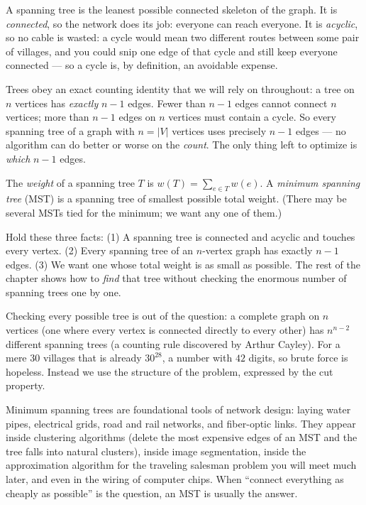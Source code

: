 \begin{intuitionbox}
A spanning tree is the leanest possible connected skeleton of the graph. It is
\emph{connected}, so the network does its job: everyone can reach everyone.
It is \emph{acyclic}, so no cable is wasted: a cycle would
mean two different routes between some pair of villages, and you could snip one
edge of that cycle and still keep everyone connected --- so a cycle is, by
definition, an avoidable expense.
\end{intuitionbox}

Trees obey an exact counting identity that we will rely on throughout: a tree on
$n$ vertices has \emph{exactly} $n-1$ edges. Fewer than $n-1$ edges cannot
connect $n$ vertices; more than $n-1$ edges on $n$ vertices must contain a cycle.
So every spanning tree of a graph with $n=|V|$ vertices uses precisely $n-1$
edges --- no algorithm can do better or worse on the \emph{count}. The only thing
left to optimize is \emph{which} $n-1$ edges.

\begin{definition}\label{ch23:def-mst}
The \emph{weight} of a spanning tree $T$ is $w(T) = \sum_{e \in T} w(e)$. A
\emph{minimum spanning tree} (MST) is a spanning tree of smallest possible total
weight. (There may be several MSTs tied for the minimum; we want any one of
them.)
\end{definition}

\begin{focusbox}
Hold these three facts:
(1) A spanning tree is connected and acyclic and touches every vertex.
(2) Every spanning tree of an $n$-vertex graph has exactly $n-1$ edges.
(3) We want one whose total weight is as small as possible.
The rest of the chapter shows how to \emph{find} that tree without checking the
enormous number of spanning trees one by one.
\end{focusbox}

Checking every possible tree is out of the question:
a complete graph on $n$ vertices (one where every vertex is connected directly to every other) has $n^{n-2}$ different spanning trees (a counting rule discovered by Arthur Cayley). For a mere $30$ villages that is already $30^{28}$, a number with $42$
digits, so brute force is hopeless. Instead we use the structure of the problem,
expressed by the cut property.

\begin{aestheticbox}
Minimum spanning trees are foundational tools of network design: laying water
pipes, electrical grids, road and rail networks, and fiber-optic links. They
appear inside clustering algorithms (delete the most expensive edges of an MST
and the tree falls into natural clusters), inside image segmentation, inside the
approximation algorithm for the traveling salesman problem you will meet much
later, and even in the wiring of computer chips. When ``connect everything as
cheaply as possible'' is the question, an MST is usually the answer.
\end{aestheticbox}

